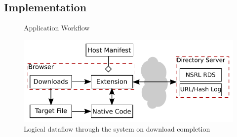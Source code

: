 \documentclass[letterpaper,twocolumn,10pt]{article}
\begin{document}
\subsection{Implementation}

\begin{figure}
    \centering
    \caption{Application Workflow}
    \label{fig:appflow}
\end{figure}

\begin{figure}
    \includegraphics[width=\textwidth]{system.pdf}
    \caption{Logical dataflow through the system on download completion}
    \label{fig:sysflow}
\end{figure}
\end{document}
